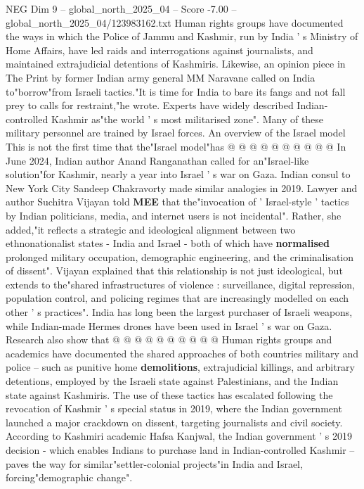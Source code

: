\begin{textsample}{NEG Dim 9 – global\_north\_2025\_04 – Score -7.00 – global\_north\_2025\_04/123983162.txt}
Human rights groups have documented the ways in which the Police of Jammu and Kashmir, run by India ' s Ministry of Home Affairs, have led raids and interrogations against journalists, and maintained extrajudicial detentions of Kashmiris.
Likewise, an opinion piece in The Print by former Indian army general MM Naravane called on India to"borrow"from Israeli tactics."It is time for India to bare its fangs and not fall prey to calls for restraint,"he wrote.
Experts have widely described Indian-controlled Kashmir as"the world ' s most militarised zone".
Many of these military personnel are trained by Israel forces.
An overview of the Israel model This is not the first time that the"Israel model"has @ @ @ @ @ @ @ @ @ @ In June 2024, Indian author Anand Ranganathan called for an"Israel-like solution"for Kashmir, nearly a year into Israel ' s war on Gaza.
Indian consul to New York City Sandeep Chakravorty made similar analogies in 2019.
Lawyer and author Suchitra Vijayan told \textbf{MEE} that the"invocation of ' Israel-style ' tactics by Indian politicians, media, and internet users is not incidental".
Rather, she added,"it reflects a strategic and ideological alignment between two ethnonationalist states - India and Israel - both of which have \textbf{normalised} prolonged military occupation, demographic engineering, and the criminalisation of dissent".
Vijayan explained that this relationship is not just ideological, but extends to the"shared infrastructures of violence : surveillance, digital repression, population control, and policing regimes that are increasingly modelled on each other ' s practices".
India has long been the largest purchaser of Israeli weapons, while Indian-made Hermes drones have been used in Israel ' s war on Gaza.
Research also show that @ @ @ @ @ @ @ @ @ @ Human rights groups and academics have documented the shared approaches of both countries military and police -- such as punitive home \textbf{demolitions}, extrajudicial killings, and arbitrary detentions, employed by the Israeli state against Palestinians, and the Indian state against Kashmiris.
The use of these tactics has escalated following the revocation of Kashmir ' s special status in 2019, where the Indian government launched a major crackdown on dissent, targeting journalists and civil society.
According to Kashmiri academic Hafsa Kanjwal, the Indian government ' s 2019 decision - which enables Indians to purchase land in Indian-controlled Kashmir -- paves the way for similar"settler-colonial projects"in India and Israel, forcing"demographic change".

\end{textsample}
